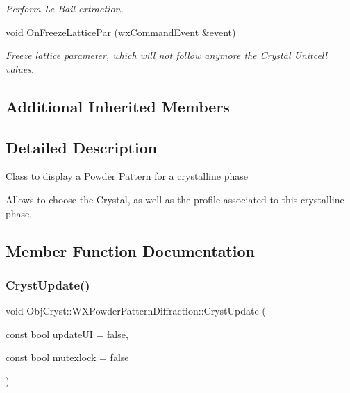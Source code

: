 \begin{DoxyCompactItemize}
\begin{DoxyCompactList}\small\item\em Perform Le Bail extraction. \end{DoxyCompactList}\item 
\mbox{\label{class_obj_cryst_1_1_w_x_powder_pattern_diffraction_a31bf2e573b1f6436930d4bd1f6272b88}} 
void \mbox{\hyperlink{class_obj_cryst_1_1_w_x_powder_pattern_diffraction_a31bf2e573b1f6436930d4bd1f6272b88}{On\+Freeze\+Lattice\+Par}} (wx\+Command\+Event \&event)
\begin{DoxyCompactList}\small\item\em Freeze lattice parameter, which will not follow anymore the Crystal Unitcell values. \end{DoxyCompactList}\end{DoxyCompactItemize}
\subsection*{Additional Inherited Members}


\subsection{Detailed Description}
Class to display a Powder Pattern for a crystalline phase

Allows to choose the Crystal, as well as the profile associated to this crystalline phase. 

\subsection{Member Function Documentation}
\mbox{\label{class_obj_cryst_1_1_w_x_powder_pattern_diffraction_a1da4c9c31433e1cee6bf77afca30818e}} 
\subsubsection{\texorpdfstring{CrystUpdate()}{CrystUpdate()}}
{\footnotesize\ttfamily void Obj\+Cryst\+::\+W\+X\+Powder\+Pattern\+Diffraction\+::\+Cryst\+Update (\begin{DoxyParamCaption}\item[{const bool}]{update\+UI = {\ttfamily false},  }\item[{const bool}]{mutexlock = {\ttfamily false} }\end{DoxyParamCaption})\hspace{0.3cm}{\ttfamily [virtual]}}


